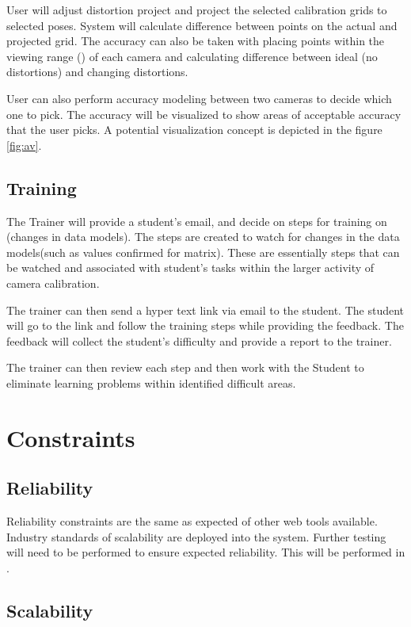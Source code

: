 \documentclass[11pt]{report}
\begin{document}
User will adjust distortion project and project the selected calibration grids to selected poses. System will calculate difference between points on the actual and projected grid. 
The accuracy can also be taken with placing points within the viewing range () of each camera and calculating difference between ideal (no distortions) and changing distortions. 

User can also perform accuracy modeling between two cameras to decide which one to pick. The accuracy will be visualized to show areas of acceptable accuracy that the user picks. A potential visualization concept is depicted in the figure \ref{fig:av}. 


\subsection{Training} 

The Trainer will provide a student's email, and decide on steps for training on (changes in data models). The steps are created to watch for changes in the data models(such as values confirmed for  matrix). These are essentially steps that can be watched and associated with student's tasks within the larger activity of camera calibration. 

The trainer can then send a hyper text link via email to the student. The student  will go to the link and follow the training steps while providing the feedback. The feedback will collect the student's difficulty and provide a report to the trainer. 

The trainer can then review each step and then work with the Student to eliminate learning problems within identified difficult areas.  

\section{Constraints}

\subsection{Reliability}

Reliability constraints are the same as expected of other web tools available. Industry standards of scalability are deployed into the system. Further testing will need to be performed to ensure expected reliability. This will be performed in .  

\subsection{Scalability}
\end{document}
